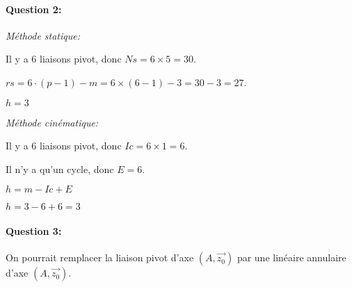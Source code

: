\paragraph{Question 2:} 

\textit{Méthode statique:}

Il y a  6 liaisons pivot, donc $Ns=6\times 5=30$.

$rs=6\cdot (p-1)-m=6\times (6-1)-3=30-3=27$.

$h=3$

\textit{Méthode cinématique:}

Il y a  6 liaisons pivot, donc $Ic=6\times 1=6$.

Il n'y a qu'un cycle, donc $E=6$.

$h = m-Ic+E$

$h = 3-6+6=3$

\paragraph{Question 3:} On pourrait remplacer la liaison pivot d'axe $(A,\vec{z_0})$ par une linéaire annulaire d'axe $(A,\vec{z_0})$.


